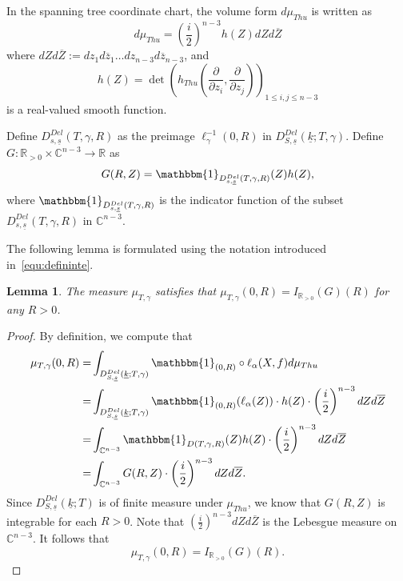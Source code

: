 \documentclass{compositio}
\numberwithin{equation}{section}
\numberwithin{figure}{section}
\theoremstyle{definition}
\theoremstyle{plain}
\newtheorem{lemma}[definition]{Lemma}
\begin{document}
{In the spanning tree coordinate chart, the volume form $d\mu_{Thu}$ is written as
\begin{equation}
    d\mu_{Thu} = \left(\frac{i}{2}\right)^{n-3}h(Z)dZd\overline{Z}
\end{equation}
where $dZd\overline{Z}:= dz_1d\overline{z}_1\ldots dz_{n-3}d\overline{z}_{n-3}$, and 
\begin{equation}\label{equ:expressionforh}
    h(Z) = \operatorname{det}\left(h_{Thu}\left(\frac{\partial}{\partial z_i},\frac{\partial}{\partial z_j}\right)\right)_{1\le i,j\le n-3}
\end{equation}
is a real-valued smooth function.

Define $D_{s,\underline{s}}^{Del}(T,\gamma,R)$ as the preimage $\ell_\gamma^{-1}(0,R)$ in $D_{S,\underline{s}}^{Del}(\underline{k};T, \gamma)$.
Define $G:\mathbb{R}_{>0}\times\mathbb{C}^{n-3}\to \mathbb{R}$ as
\begin{equation}
    G(R, Z)=\mathbbm{1}_{D_{s,\underline{s}}^{Del}(T,\gamma,R)}(Z)h(Z),
\end{equation}
where $\mathbbm{1}_{D_{s,\underline{s}}^{Del}(T,\gamma,R)}$ is the indicator function of the subset $D_{s,\underline{s}}^{Del}(T,\gamma,R)$ in $\mathbb{C}^{n-3}$.

The following lemma is formulated using the notation introduced in~\eqref{equ:defininte}.

\begin{lemma}\label{lem:measureandintegral}
    The measure $\mu_{T,\gamma}$ satisfies that $\mu_{T,\gamma}(0,R) = I_{\mathbb{R}_{>0}}(G)(R)$ for any $R>0$. 
\end{lemma}

\begin{proof}
    By definition, we compute that 
    \begin{align*}
        \mu_{T,\gamma}(0,R) 
        =&\int_{D_{S,\underline{s}}^{Del}(\underline{k};T, \gamma)}\mathbbm{1}_{(0,R)}\circ \ell_{\alpha}(X,f)d\mu_{Thu}\\
        =& \int_{D_{S,\underline{s}}^{Del}(\underline{k};T, \gamma)}\mathbbm{1}_{(0,R)}(\ell_{\alpha}(Z))\cdot h(Z) \cdot\left(\frac{i}{2}\right)^{n-3}dZd\overline{Z}\\
        =& \int_{\mathbb C^{n-3}}\mathbbm{1}_{D(T,\gamma,R)}(Z)h(Z)\cdot\left(\frac{i}{2}\right)^{n-3}dZd\overline{Z}\\
        =& \int_{\mathbb C^{n-3}} G(R, Z)\cdot\left(\frac{i}{2}\right)^{n-3}dZd\overline{Z}.
    \end{align*}
    Since $D_{S,\underline{s}}^{Del}(\underline{k};T)$ is of finite measure under $\mu_{Thu}$, we know that $G(R,Z)$ is integrable for each $R>0$. Note that $\left(\frac{i}{2}\right)^{n-3}dZd\overline{Z}$ is the Lebesgue measure on $\mathbb{C}^{n-3}$. It follows that 
    $$\mu_{T,\gamma}(0,R) = I_{\mathbb{R}_{>0}}(G)(R).$$  
\end{proof}

}
\end{document}
